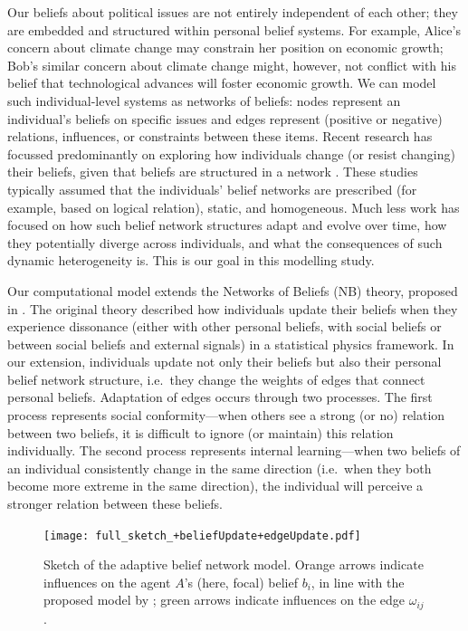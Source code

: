 Our beliefs about political issues are not entirely independent of each other; they are embedded and structured within personal belief systems. For example, Alice's concern about climate change may constrain her position on economic growth; Bob's similar concern about climate change might, however, not conflict with his belief that technological advances will foster economic growth. We can model such individual-level systems as networks of beliefs: nodes represent an individual's beliefs on specific issues and edges represent (positive or negative) relations, influences, or constraints between these items. Recent research has focussed predominantly on exploring how individuals change (or resist changing) their beliefs, given that beliefs are structured in a network \cite{baumannEmergencePolarizedIdeological2021, brandtEvaluatingBeliefSystem2021, friedkinNetworkScienceBelief2016, dalegeNetworksBeliefsIntegrative2025}. These studies typically assumed that the individuals' belief networks are prescribed (for example, based on logical relation), static, and homogeneous. Much less work has focused on how such belief network structures adapt and evolve over time, how they potentially diverge across individuals, and what the consequences of such dynamic heterogeneity is. This is our goal in this modelling study.

Our computational model extends the Networks of Beliefs (NB) theory, proposed in \citet{dalegeNetworksBeliefsIntegrative2025}. The original theory described how individuals update their beliefs when they experience dissonance (either with other personal beliefs, with social beliefs or between social beliefs and external signals) in a statistical physics framework. In our extension, individuals update not only their beliefs but also their personal belief network structure, i.e.~they change the weights of edges that connect personal beliefs. Adaptation of edges occurs through two processes. The first process represents social conformity---when others see a strong (or no) relation between two beliefs, it is difficult to ignore (or maintain) this relation individually. The second process represents internal learning---when two beliefs of an individual consistently change in the same direction (i.e.~when they both become more extreme in the same direction), the individual will perceive a stronger relation between these beliefs. 

\begin{figure}[h]
    \centering
    \texttt{[image: full\_sketch\_+beliefUpdate+edgeUpdate.pdf]}
    \caption{Sketch of the adaptive belief network model. Orange arrows indicate influences on the agent $A$'s (here, focal) belief $b_i$, in line with the proposed model by \citet{dalegeNetworksBeliefsIntegrative2025}; green arrows indicate influences on the edge $\omega_{ij}$.}
    \label{fig:sketch}
\end{figure}

